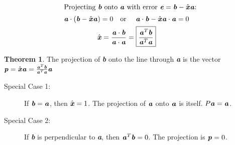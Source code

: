 \documentclass[12pt, letterpaper]{article}
\newcommand{\V}[1]{\textbf{\textit{#1}}}
\newcommand{\DefinitionSpace}{\vspace{15px}}
\theoremstyle{definition}
\newtheorem{theorem}{Theorem}
\begin{document}
		\begin{gather*}
			\intertext{Projecting \V{b} onto \V{a} with error $\V{e} = \V{b} - \hat{\V{x}}\V{a}$:}
				\V{a} \cdot (\V{b} - \hat{\V{x}}\V{a}) = 0 \text{\quad or \quad} \V{a} \cdot \V{b} - \hat{\V{x}}\V{a} \cdot \V{a} = 0  \\
				\hat{\V{x}} = \frac{\V{a} \cdot \V{b}}{\V{a} \cdot \V{a}} = \boxed{\frac{\V{a}^T\V{b}}{\V{a}^T\V{a}}}
		\end{gather*}

		
		\begin{theorem}
			The projection of \V{b} onto the line through \V{a} is the vector $\V{p} = \hat{\V{x}}\V{a} = \frac{\V{a}^T\V{b}}{\V{a}^T\V{a}} \V{a}$
				\begin{description}
					\item[Special Case 1:] If $\V{b} = \V{a}$, then $\hat{\V{x}} = 1$. The projection of $\V{a}$ onto $\V{a}$ is itself. $P\V{a} = \V{a}$.  
					\item[Special Case 2:] If \V{b} is perpendicular to \V{a}, then $\V{a}^T \V{b} = 0$. The projection is $\V{p} = 0$.
				\end{description}
		\end{theorem}\DefinitionSpace 
\end{document}
